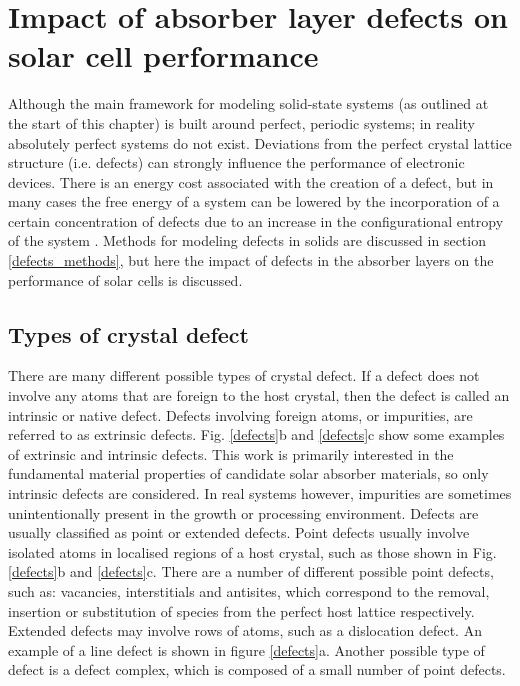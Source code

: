 \documentclass[11pt, twoside]{report}
\begin{document}
\section{Impact of absorber layer defects on solar cell performance}\label{defects_impact}
Although the main framework for modeling solid-state systems (as outlined at the start of this chapter) is built around perfect, periodic systems; in reality absolutely perfect systems do not exist. Deviations from the perfect crystal lattice structure (i.e. defects) can strongly influence the performance of electronic devices. There is an energy cost associated with the creation of a defect, but in many cases the free energy of a system can be lowered by the incorporation of a certain concentration of defects due to an increase in the configurational entropy of the system \cite{AshcroftMermin_general}. Methods for modeling defects in solids are discussed in section \ref{defects_methods}, but here the impact of defects in the absorber layers on the performance of solar cells is discussed.

\subsection{Types of crystal defect}

There are many different possible types of crystal defect. If a defect does not involve any atoms that are foreign to the host crystal, then the defect is called an intrinsic or native defect. Defects involving foreign atoms, or impurities, are referred to as extrinsic defects. Fig. \ref{defects}b and \ref{defects}c show some examples of extrinsic and intrinsic defects. This work is primarily interested in the fundamental material properties of candidate solar absorber materials, so only intrinsic defects are considered. In real systems however, impurities are sometimes unintentionally present in the growth or processing environment.
Defects are usually classified as point or extended defects. Point defects usually involve isolated atoms in localised regions of a host crystal, such as those shown in Fig. \ref{defects}b and \ref{defects}c. There are a number of different possible point defects, such as: vacancies, interstitials and antisites, which correspond to the removal, insertion or substitution of species from the perfect host lattice respectively. Extended defects may involve rows of atoms, such as a dislocation defect. An example of a line defect is shown in figure \ref{defects}a. Another possible type of defect is a defect complex, which is composed of a small number of point defects.
\end{document}
